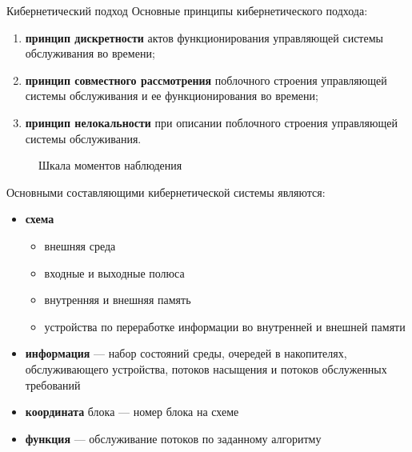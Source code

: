 \documentclass[10pt]{beamer}
\begin{document}
\begin{frame}[allowframebreaks]{Кибернетический подход}
Основные принципы кибернетического подхода:
  \begin{enumerate}
  \item \textbf{принцип дискретности} актов функционирования управляющей системы обслуживания во времени;
    \item \textbf{принцип совместного
    рассмотрения} поблочного строения управляющей системы
    обслуживания и ее функционирования во времени;
  \item \textbf{принцип нелокальности} при описании поблочного
    строения управляющей системы обслуживания.
  \end{enumerate}
  \framebreak
  
  
    \begin{figure}[h]
    \centering
    \caption{Шкала моментов наблюдения}
    \label{VK:fig:3}
  \end{figure}
 
  \framebreak
  
  
Основными составляющими кибернетической системы являются:
  \begin{itemize}
  \item \textbf{схема}
  \begin{itemize}
      \item внешняя среда
      \item входные и выходные полюса
      \item внутренняя и внешняя память
      \item устройства по переработке информации во внутренней и внешней памяти
      \end{itemize}
  \item \textbf{информация} --- набор состояний среды, очередей в накопителях, обслуживающего устройства, потоков насыщения и потоков обслуженных требований
  \item \textbf{координата} блока --- номер блока на схеме
  \item \textbf{функция} --- обслуживание потоков по заданному алгоритму
  \end{itemize}
\end{frame}
\end{document}
